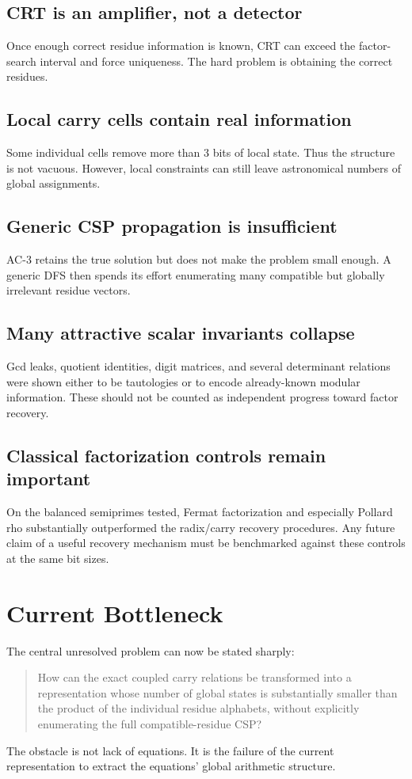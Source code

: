 \documentclass[11pt,a4paper]{article}
\begin{document}
\subsection{CRT is an amplifier, not a detector}
Once enough correct residue information is known, CRT can exceed the factor-search interval and force uniqueness. The hard problem is obtaining the correct residues.

\subsection{Local carry cells contain real information}
Some individual cells remove more than 3 bits of local state. Thus the structure is not vacuous. However, local constraints can still leave astronomical numbers of global assignments.

\subsection{Generic CSP propagation is insufficient}
AC-3 retains the true solution but does not make the problem small enough. A generic DFS then spends its effort enumerating many compatible but globally irrelevant residue vectors.

\subsection{Many attractive scalar invariants collapse}
Gcd leaks, quotient identities, digit matrices, and several determinant relations were shown either to be tautologies or to encode already-known modular information. These should not be counted as independent progress toward factor recovery.

\subsection{Classical factorization controls remain important}
On the balanced semiprimes tested, Fermat factorization and especially Pollard rho substantially outperformed the radix/carry recovery procedures. Any future claim of a useful recovery mechanism must be benchmarked against these controls at the same bit sizes.

\section{Current Bottleneck}
The central unresolved problem can now be stated sharply:
\begin{quote}
How can the exact coupled carry relations be transformed into a representation whose number of global states is substantially smaller than the product of the individual residue alphabets, without explicitly enumerating the full compatible-residue CSP?
\end{quote}
The obstacle is not lack of equations. It is the failure of the current representation to extract the equations' global arithmetic structure.
\end{document}
